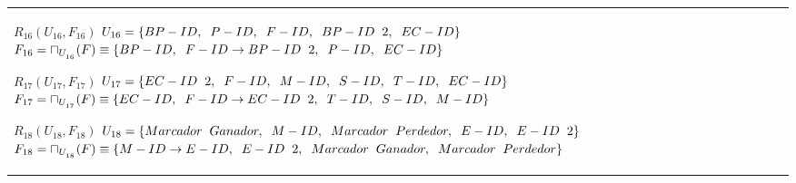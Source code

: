 \documentclass{report}
\begin{document}
\begin{tabularx}{\textwidth}{|X|}
        $ R_{16} ( U_{16} , F_{16} ) $ \newline 
        $ U_{16} = \{{BP-ID, \hspace{0.2cm}  P-ID, \hspace{0.2cm}  F-ID, \hspace{0.2cm}  BP-ID \hspace{0.2cm} 2, \hspace{0.2cm}  EC-ID}\} $ \newline 
        $ F_{16} = \sqcap_{U_{_{16}}}(F) \equiv \{BP-ID, \hspace{0.2cm} F-ID \rightarrow BP-ID \hspace{0.2cm} 2, \hspace{0.2cm} P-ID, \hspace{0.2cm} EC-ID \} $\newline 

        $ R_{17} ( U_{17} , F_{17} ) $ \newline 
        $ U_{17} = \{{EC-ID \hspace{0.2cm} 2, \hspace{0.2cm}  F-ID, \hspace{0.2cm}  M-ID, \hspace{0.2cm}  S-ID, \hspace{0.2cm}  T-ID, \hspace{0.2cm}  EC-ID}\} $ \newline 
        $ F_{17} = \sqcap_{U_{_{17}}}(F) \equiv \{EC-ID, \hspace{0.2cm} F-ID \rightarrow EC-ID \hspace{0.2cm} 2, \hspace{0.2cm} T-ID, \hspace{0.2cm} S-ID, \hspace{0.2cm} M-ID \} $\newline 

        $ R_{18} ( U_{18} , F_{18} ) $ \newline 
        $ U_{18} = \{{Marcador \hspace{0.2cm} Ganador, \hspace{0.2cm}  M-ID, \hspace{0.2cm}  Marcador \hspace{0.2cm} Perdedor, \hspace{0.2cm}  E-ID, \hspace{0.2cm}  E-ID \hspace{0.2cm} 2}\} $ \newline 
        $ F_{18} = \sqcap_{U_{_{18}}}(F) \equiv \{M-ID \rightarrow E-ID, \hspace{0.2cm} E-ID \hspace{0.2cm} 2, \hspace{0.2cm} Marcador \hspace{0.2cm} Ganador, \hspace{0.2cm} Marcador \hspace{0.2cm} Perdedor \} $\newline \\


\end{tabularx}
\end{document}
